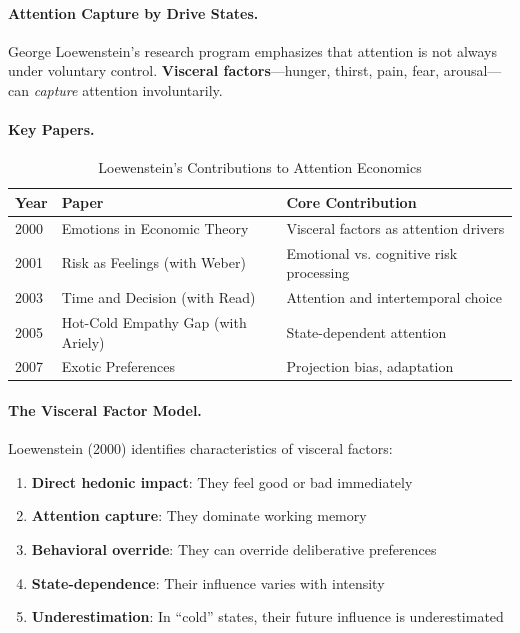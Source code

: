 \paragraph{Attention Capture by Drive States.}
George Loewenstein's research program emphasizes that attention is not always 
under voluntary control. \textbf{Visceral factors}---hunger, thirst, pain, 
fear, arousal---can \emph{capture} attention involuntarily.

\paragraph{Key Papers.}

\begin{table}[htbp]
\centering
\caption{Loewenstein's Contributions to Attention Economics}
\label{tab:loewenstein-papers}
\renewcommand{\arraystretch}{1.3}
\small
\begin{tabular}{@{}llp{5cm}@{}}
\toprule
\textbf{Year} & \textbf{Paper} & \textbf{Core Contribution} \\
\midrule
2000 & Emotions in Economic Theory & Visceral factors as attention drivers \\
2001 & Risk as Feelings (with Weber) & Emotional vs. cognitive risk processing \\
2003 & Time and Decision (with Read) & Attention and intertemporal choice \\
2005 & Hot-Cold Empathy Gap (with Ariely) & State-dependent attention \\
2007 & Exotic Preferences & Projection bias, adaptation \\
\bottomrule
\end{tabular}
\end{table}

\paragraph{The Visceral Factor Model.}
Loewenstein (2000) identifies characteristics of visceral factors:

\begin{enumerate}
\item \textbf{Direct hedonic impact}: They feel good or bad immediately
\item \textbf{Attention capture}: They dominate working memory
\item \textbf{Behavioral override}: They can override deliberative preferences
\item \textbf{State-dependence}: Their influence varies with intensity
\item \textbf{Underestimation}: In ``cold'' states, their future influence is underestimated
\end{enumerate}

